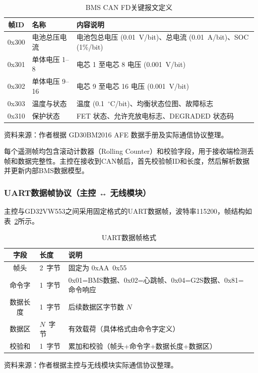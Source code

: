 \begin{table}[htbp]
  \centering
  \caption{BMS CAN FD关键报文定义}
  \label{tab:can_protocol}
  \begin{tabular}{@{}clp{8.5cm}@{}}
    \toprule
    \textbf{帧ID} & \textbf{名称} & \textbf{内容说明} \\
    \midrule
    0x300 & 电池总压电流 & 电池包总电压 (0.01~V/bit)、总电流 (0.01~A/bit)、SOC (1\%/bit) \\
    0x301 & 单体电压 1--8 & 电芯 1 至电芯 8 电压 (0.001~V/bit) \\
    0x302 & 单体电压 9--16 & 电芯 9 至电芯 16 电压 (0.001~V/bit) \\
    0x303 & 温度与状态 & 温度 (0.1~$^\circ$C/bit)、均衡状态位图、故障标志 \\
    0x310 & 保护状态 & FET 状态、允许充放电标志、DEGRADED 状态码 \\
    \bottomrule
  \end{tabular}
\end{table}
\vspace{-0.3em}
{\small 资料来源：作者根据 GD30BM2016 AFE 数据手册及实际通信协议整理。}

每个遥测帧均包含滚动计数器（Rolling Counter）和校验字段，用于接收端检测丢帧和数据完整性。主控在接收到CAN帧后，首先校验帧ID和长度，然后解析数据并更新内部BMS数据模型。

\subsubsection{UART数据帧协议（主控 ↔ 无线模块）}

主控与GD32VW553之间采用固定格式的UART数据帧，波特率115200，帧结构如表~\ref{tab:uart_protocol}所示。

\begin{table}[htbp]
  \centering
  \caption{UART数据帧格式}
  \label{tab:uart_protocol}
  \begin{tabular}{@{}cll@{}}
    \toprule
    \textbf{字段} & \textbf{长度} & \textbf{说明} \\
    \midrule
    帧头     & 2~字节 & 固定为 0xAA~0x55 \\
    命令字   & 1~字节 & 0x01=BMS数据、0x02=心跳帧、0x04=G2S数据、0x81=命令响应 \\
    数据长度 & 1~字节 & 后续数据区字节数 $N$ \\
    数据区   & $N$~字节 & 有效载荷（具体格式由命令字定义） \\
    校验和   & 1~字节 & 累加和校验（帧头+命令字+数据长度+数据区） \\
    \bottomrule
  \end{tabular}
\end{table}
\vspace{-0.3em}
{\small 资料来源：作者根据主控与无线模块实际通信协议整理。}

